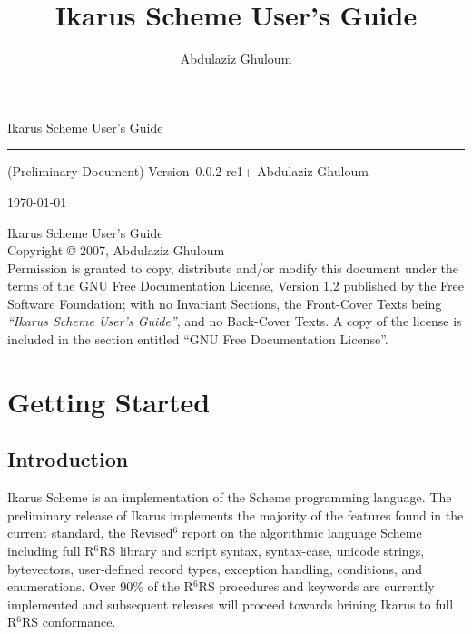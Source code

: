 \documentclass[onecolumn, 12pt, twoside, openright, dvipdfm]{book}
\newcommand{\rnrs}[1]{R$^{\mathrm{#1}}$RS}
\begin{document}
\frontmatter

\VerbatimFootnotes

\title{Ikarus Scheme User's Guide}

\author{Abdulaziz Ghuloum}

\pagestyle{empty}

\mbox{}
\vspace{3in}

{
\fontsize{66}{66}
\begin{center}
Ikarus Scheme User's Guide
\end{center} 
}
\noindent
\rule{\textwidth}{6pt} 
{\fontsize{18}{18}
\hfill{}
(Preliminary Document)
\hfill Version~0.0.2-rc1+
}
\vfill
{
\fontsize{24}{24}
\hfill{} Abdulaziz Ghuloum
}

{
\fontsize{18}{18}
\hfill{} \today
}

\newpage
\mbox{}
\vfill{}
\noindent
Ikarus Scheme User's Guide\\
Copyright \copyright{} 2007,  Abdulaziz Ghuloum\\

\noindent
Permission is granted to copy, distribute and/or modify this
document under the terms of the GNU Free Documentation License,
Version 1.2 published by the Free Software
Foundation; with no Invariant Sections, the Front-Cover Texts
being \emph{``Ikarus Scheme User's Guide''}, and
no Back-Cover Texts.  A copy of the license is included in the
section entitled ``GNU Free Documentation License''.

\newpage

\pagestyle{fancy}
\tableofcontents

\newpage

\mainmatter
\setlength{\parindent}{0pt} 
\setlength{\parskip}{2.0ex plus 0ex minus 0ex}
\chapter{Getting Started}
\section{Introduction}

Ikarus Scheme is an implementation of the Scheme programming
language.  The preliminary release of Ikarus implements the majority
of the features found in the current standard, the
Revised$^\mathrm{6}$ report on the algorithmic language
Scheme\cite{r6rs} including full \rnrs{6} library and script syntax,
syntax-case, unicode strings, bytevectors, user-defined record
types, exception handling, conditions, and enumerations.  Over 90\%
of the \rnrs{6} procedures and keywords are currently implemented
and subsequent releases will proceed towards brining Ikarus to full
\rnrs{6} conformance.
\end{document}
